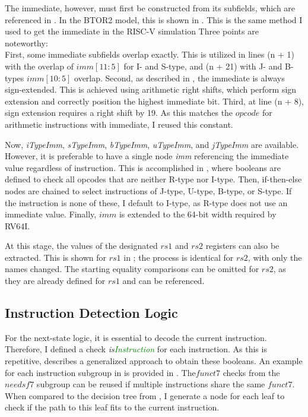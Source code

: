 The immediate, however, must first be constructed from its subfields,
which are referenced in . In the BTOR2
model, this is shown in . This is the
same method I used to get the immediate in the RISC-V simulation
 Three points are noteworthy:\\ First, some
immediate subfields overlap exactly. This is utilized in lines (n +
1) with the overlap of $imm[11:5]$ for I- and S-type, and (n + 21)
with J- and B-types $imm[10:5]$ overlap. Second, as described in
, the immediate is always sign-extended. This is
achieved using arithmetic right shifts, which perform sign extension
and correctly position the highest immediate bit. Third, at line (n +
8), sign extension requires a right shift by 19. As this matches the
$opcode$ for arithmetic instructions with immediate, I reused this
constant.

Now, \textsl{iTypeImm}, \textsl{sTypeImm}, \textsl{bTypeImm},
\textsl{uTypeImm}, and \textsl{jTypeImm} are available. However, it
is preferable to have a single node \textsl{imm} referencing the
immediate value regardless of instruction. This is accomplished in
, where booleans are defined to check all
opcodes that are neither R-type nor I-type. Then, if-then-else nodes
are chained to select instructions of J-type, U-type, B-type, or
S-type. If the instruction is none of these, I default to I-type, as
R-type does not use an immediate value. Finally, $imm$ is extended to
the 64-bit width required by RV64I.

At this stage, the values of the designated $rs1$ and $rs2$ registers
can also be extracted. This is shown for $rs1$ in
; the process is identical for $rs2$, with
only the names changed. The starting equality comparisons can be
omitted for $rs2$, as they are already defined for $rs1$ and can be
referenced.






\subsection{Instruction Detection Logic}
For the next-state logic, it is essential to decode the current
instruction. Therefore, I defined a check
\textsl{is\textcolor{Green}{Instruction}} for each instruction. As
this is repetitive,  describes a
generalized approach to obtain these booleans. An example for each
instruction subgroup in  is provided in
. The$funct7$ checks from the $needsf7$
subgroup can be reused if multiple instructions share the same
$funct7$. When compared to the decision tree from ,
I generate a node for each leaf to check if the path to this leaf
fits to the current instruction.

